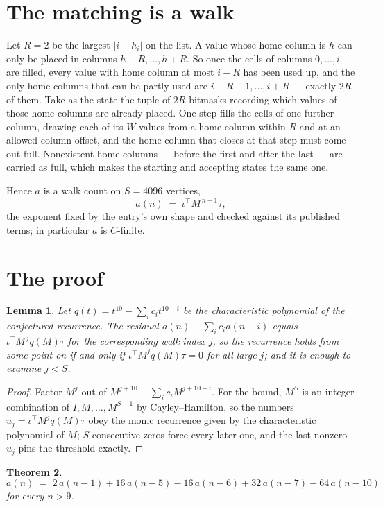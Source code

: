 \documentclass[11pt,a4paper]{article}
\theoremstyle{plain}
\newtheorem{theorem}{Theorem}
\newtheorem{lemma}[theorem]{Lemma}
\theoremstyle{definition}
\begin{document}
\section{The matching is a walk}

Let $R=2$ be the largest $|i-h_i|$ on the list. A value whose home column is $h$ can only be
placed in columns $h-R,\dots,h+R$. So once the cells of columns $0,\dots,i$ are filled, every
value with home column at most $i-R$ has been used up, and the only home columns that can be
partly used are $i-R+1,\dots,i+R$ --- exactly $2R$ of them. Take as the state the tuple of
$2R$ bitmasks recording which values of those home columns are already placed. One step fills
the cells of one further column, drawing each of its $W$ values from a home column within $R$
and at an allowed column offset, and the home column that closes at that step must come out
full. Nonexistent home columns --- before the first and after the last --- are carried as
full, which makes the starting and accepting states the same one.

Hence $a$ is a walk count on $S=4096$ vertices,
\[
a(n)\;=\;\iota^{\!\top}M^{\,n+1}\tau ,
\]
the exponent fixed by the entry's own shape and checked against its published terms; in
particular $a$ is $C$-finite.

\section{The proof}

\begin{lemma}\label{lem:crit}
Let $q(t)=t^{10}-\sum_i c_it^{10-i}$ be the characteristic polynomial of the
conjectured recurrence. The residual $a(n)-\sum_ic_ia(n-i)$ equals
$\iota^{\!\top}M^{\,j}q(M)\tau$ for the corresponding walk index $j$, so the recurrence
holds from some point on if and only if $\iota^{\!\top}M^{j}q(M)\tau=0$ for all large $j$;
and it is enough to examine $j<S$.
\end{lemma}

\begin{proof}
Factor $M^{j}$ out of $M^{j+10}-\sum_ic_iM^{j+10-i}$. For the bound, $M^{S}$
is an integer combination of $I,M,\dots,M^{S-1}$ by Cayley--Hamilton, so the numbers
$u_j=\iota^{\!\top}M^{j}q(M)\tau$ obey the monic recurrence given by the characteristic
polynomial of $M$; $S$ consecutive zeros force every later one, and the last nonzero $u_j$
pins the threshold exactly.
\end{proof}

\begin{theorem}
\[
a(n)\;=\;2\,a(n-1) + 16\,a(n-5) - 16\,a(n-6) + 32\,a(n-7) - 64\,a(n-10)
\]
for every $n>9$.
\end{theorem}
\end{document}
